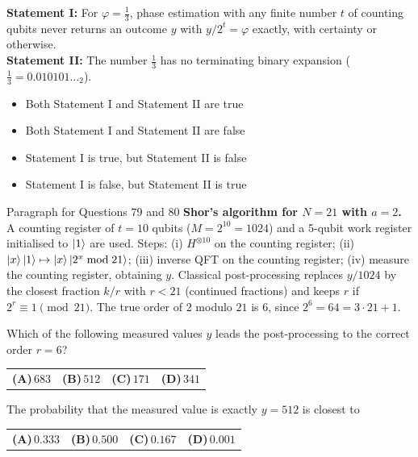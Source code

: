 \documentclass[11pt,a4paper]{article}
\newcommand{\optlabel}[1]{\textbf{(#1)}}
\newenvironment{qitem}[1]{\begin{list}{}{\setlength{\leftmargin}{3.3em}\setlength{\labelwidth}{3.1em}%
  \setlength{\labelsep}{0.2em}\setlength{\topsep}{3pt}\setlength{\parsep}{3pt}}\item[\textbf{Q.#1}\hfill]}{\end{list}}
\newcommand{\qsep}{\par\vspace{2pt}{\color{black!15}\hrule}\vspace{4pt}}
\begin{document}
\begin{qitem}{78}
\textbf{Statement I:} For $\varphi = \frac13$, phase estimation with any finite number $t$ of counting qubits never returns an
outcome $y$ with $y/2^t = \varphi$ exactly, with certainty or otherwise.\\[1mm]
\textbf{Statement II:} The number $\frac13$ has no terminating binary expansion ($\frac13 = 0.010101\ldots_2$).
\begin{itemize}[leftmargin=2.6em, labelsep=0.4em, itemsep=2pt, topsep=3pt]
\item[\optlabel{A}] Both Statement I and Statement II are true
\item[\optlabel{B}] Both Statement I and Statement II are false
\item[\optlabel{C}] Statement I is true, but Statement II is false
\item[\optlabel{D}] Statement I is false, but Statement II is true
\end{itemize}
\end{qitem}
\qsep

\begin{passagebox}{Paragraph for Questions 79 and 80}
\textbf{Shor's algorithm for $N = 21$ with $a = 2$.} A counting register of $t = 10$ qubits ($M = 2^{10} = 1024$) and a
5-qubit work register initialised to $\ket{1}$ are used. Steps: (i) $H^{\otimes 10}$ on the counting register;
(ii) $\ket{x}\ket{1} \mapsto \ket{x}\ket{2^x \bmod 21}$; (iii) inverse QFT on the counting register; (iv) measure the counting
register, obtaining $y$. Classical post-processing replaces $y/1024$ by the closest fraction $k/r$ with $r < 21$ (continued
fractions) and keeps $r$ if $2^r \equiv 1 \pmod{21}$. The true order of $2$ modulo $21$ is $6$, since $2^6 = 64 = 3\cdot21 + 1$.
\end{passagebox}
\begin{qitem}{79}
Which of the following measured values $y$ leads the post-processing to the correct order $r = 6$?
\par\smallskip\noindent\begin{tabularx}{\linewidth}{@{}*{4}{L}@{}}
\optlabel{A}\,$683$ & \optlabel{B}\,$512$ & \optlabel{C}\,$171$ & \optlabel{D}\,$341$
\end{tabularx}
\end{qitem}
\qsep

\begin{qitem}{80}
The probability that the measured value is exactly $y = 512$ is closest to
\par\smallskip\noindent\begin{tabularx}{\linewidth}{@{}*{4}{L}@{}}
\optlabel{A}\,$0.333$ & \optlabel{B}\,$0.500$ & \optlabel{C}\,$0.167$ & \optlabel{D}\,$0.001$
\end{tabularx}
\end{qitem}
\qsep
\end{document}
